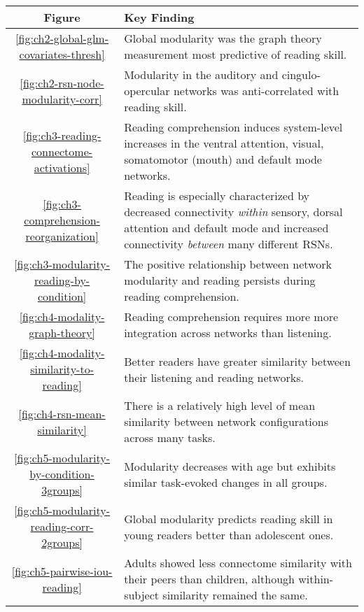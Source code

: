 \begin{tabular}{c|p{10cm}}
\toprule 
Figure & Key Finding \\ 
\midrule 
\ref{fig:ch2-global-glm-covariates-thresh} & Global modularity was the graph theory measurement most predictive of reading skill. \\ 
 \ref{fig:ch2-rsn-node-modularity-corr} & Modularity in the auditory and cingulo-opercular networks was anti-correlated with reading skill.	\\ 
\ref{fig:ch3-reading-connectome-activations} & Reading comprehension induces system-level increases in the ventral attention, visual, somatomotor (mouth) and default mode networks.	 \\ 
\ref{fig:ch3-comprehension-reorganization}  & Reading is especially characterized by decreased connectivity \textit{within} sensory, dorsal attention and default mode and increased connectivity \textit{between} many different RSNs.  \\ 
\ref{fig:ch3-modularity-reading-by-condition}  & The positive relationship between network modularity and reading persists during reading comprehension.  \\ 
\ref{fig:ch4-modality-graph-theory}  & Reading comprehension requires more more integration across networks than listening. \\ 
\ref{fig:ch4-modality-similarity-to-reading} & Better readers have greater similarity between their listening and reading networks.\\
\ref{fig:ch4-rsn-mean-similarity} & There is a relatively high level of mean similarity between network configurations across many tasks.\\
\ref{fig:ch5-modularity-by-condition-3groups} & Modularity decreases with age but exhibits similar task-evoked changes in all groups. \\
\ref{fig:ch5-modularity-reading-corr-2groups} & Global modularity predicts reading skill in young readers better than adolescent ones. \\
\ref{fig:ch5-pairwise-iou-reading} & Adults showed less connectome similarity with their peers than children, although within-subject similarity remained the same.\\
\bottomrule 
\end{tabular}